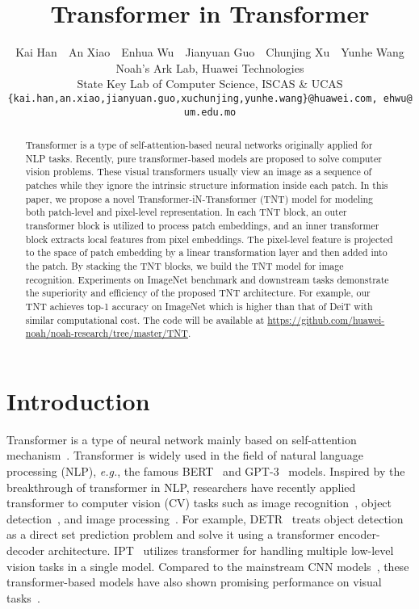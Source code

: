 \documentclass{article}
\title{Transformer in Transformer}
\author{Kai Han~~An Xiao~~Enhua Wu~~Jianyuan Guo~~Chunjing Xu~~Yunhe Wang \\
  Noah's Ark Lab, Huawei Technologies\\
  State Key Lab of Computer Science, ISCAS \& UCAS\\
  \texttt{\small \{kai.han,an.xiao,jianyuan.guo,xuchunjing,yunhe.wang\}@huawei.com,\ ehwu@um.edu.mo} \\
}
\begin{document}
\maketitle

\begin{abstract}
	Transformer is a type of self-attention-based neural networks originally applied for NLP tasks. Recently, pure transformer-based models are proposed to solve computer vision problems. These visual transformers usually view an image as a sequence of patches while they ignore the intrinsic structure information inside each patch. In this paper, we propose a novel Transformer-iN-Transformer (TNT) model for modeling both patch-level and pixel-level representation. In each TNT block, an outer transformer block is utilized to process patch embeddings, and an inner transformer block extracts local features from pixel embeddings. The pixel-level feature is projected to the space of patch embedding by a linear transformation layer and then added into the patch. By stacking the TNT blocks, we build the TNT model for image recognition. Experiments on ImageNet benchmark and downstream tasks demonstrate the superiority and efficiency of the proposed TNT architecture. For example, our TNT achieves  top-1 accuracy on ImageNet which is  higher than that of DeiT with similar computational cost. The code will be available at \url{https://github.com/huawei-noah/noah-research/tree/master/TNT}.
\end{abstract}

\section{Introduction}
\label{sec:intro}
Transformer is a type of neural network mainly based on self-attention mechanism~\cite{Att}. Transformer is widely used in the field of natural language processing (NLP), \emph{e.g.}, the famous BERT~\cite{bert} and GPT-3~\cite{gpt3} models. Inspired by the breakthrough of transformer in NLP, researchers have recently applied transformer to computer vision (CV) tasks such as image recognition~\cite{vit,deit}, object detection~\cite{detr,ddetr}, and image processing~\cite{ipt}. For example, DETR~\cite{detr} treats object detection as a direct set prediction problem and solve it using a transformer encoder-decoder architecture. IPT~\cite{ipt} utilizes transformer for handling multiple low-level vision tasks in a single model. Compared to the mainstream CNN models~\cite{nin,resnet,efficientnet}, these transformer-based models have also shown promising performance on visual tasks~\cite{han2020survey}.
\end{document}
